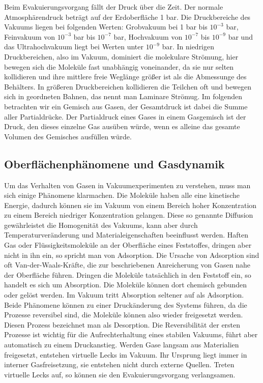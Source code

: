 Beim Evakuierungsvorgang fällt der Druck über die Zeit. Der normale Atmosphärendruck beträgt auf der Erdoberfläche 1 bar.
Die Druckbereiche des Vakuums liegen bei folgenden Werten:
Grobvakuum bei 1 bar bis $10^{-3}$ bar,  Feinvakuum von $10^{-3}$ bar bis $10^{-7}$ bar, Hochvakuum von $10^{-7}$ bis $10^{-9}$ bar und
das Ultrahochvakuum liegt bei Werten unter $10^{-9}$ bar.
In niedrigen Druckbereichen, also im Vakuum, dominiert die molekulare Strömung, hier bewegen sich die Moleküle fast unabhängig voneinander,
da sie nur selten kollidieren und ihre mittlere freie Weglänge größer ist als die Abmessunge des Behälters.
In größeren Druckbereichen kollidieren die Teilchen oft 
und bewegen sich in geordneten Bahnen, das nennt man Laminare Strömug.
Im folgenden betrachten wir ein Gemisch aus Gasen, der Gesamtdruck ist dabei die Summe aller Partialdrücke. Der Partialdruck eines Gases in
einem Gasgemisch ist der Druck, den dieses einzelne Gas ausüben würde, wenn es alleine das gesamte Volumen des Gemisches ausfüllen würde.



\subsection{Oberflächenphänomene und Gasdynamik}


Um das Verhalten von Gasen in Vakuumexperimenten zu verstehen, muss man sich einige Phänomene klarmachen.
Die Moleküle haben alle
eine kinetische Energie, dadurch können sie im Vakuum von einem Bereich hoher Konzentration zu einem Bereich niedriger Konzentration 
gelangen. Diese so genannte Diffusion gewährleistet die Homogenität des Vakuums, kann aber durch Temperaturveränderung und Materialeigenschaften
beeinflusst werden. Haften Gas oder Flüssigkeitsmoleküle an der Oberfläche eines Feststoffes, dringen aber nicht in ihn ein, so spricht man 
von Adsorption. Die Ursache von Adsorption sind oft Van-der-Waals-Kräfte, die zur beschriebenen Anreicherung von Gasen nahe der Oberfläche führen.
Dringen die Moleküle tatsächlich in den Feststoff ein, so handelt es sich um Absorption. Die Moleküle können dort chemisch gebunden oder 
gelöst werden. Im Vakuum tritt Absorption seltener auf als Adsorption. Beide Phänomene können zu einer Druckänderung des Systems führen,
da die Prozesse reversibel sind, die Moleküle können also wieder freigesetzt werden. Diesen Prozess bezeichnet man als Desorption. Die
Reversibilität der ersten Prozesse ist wichtig für die Aufrechterhaltung eines stabilen Vakuums, führt aber automatisch zu einem Druckanstieg. 
Werden Gase langsam aus Materialien freigesetzt, entstehen virtuelle Lecks im Vakuum. Ihr Ursprung liegt immer in interner Gasfreisetzung, 
sie entstehen nicht durch externe Quellen. Treten virtuelle Lecks auf, so können sie den Evakuierungsvorgang verlangsamen.

